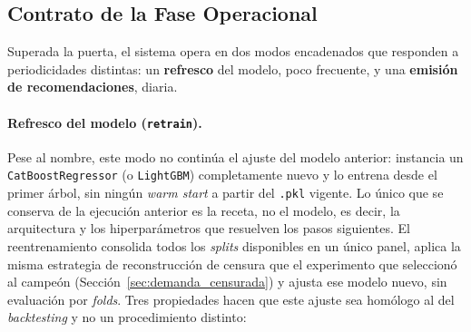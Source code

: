 \subsection{Contrato de la Fase Operacional}
\label{sec:contrato_operacional}

Superada la puerta, el sistema opera en dos modos encadenados que responden a periodicidades distintas: un \textbf{refresco} del modelo, poco frecuente, y una \textbf{emisión de recomendaciones}, diaria.

\paragraph{Refresco del modelo (\texttt{retrain}).} Pese al nombre, este modo no continúa el ajuste del modelo anterior: instancia un \texttt{CatBoostRegressor} (o \texttt{LightGBM}) completamente nuevo y lo entrena desde el primer árbol, sin ningún \textit{warm start} a partir del \texttt{.pkl} vigente. Lo único que se conserva de la ejecución anterior es la receta, no el modelo, es decir, la arquitectura y los hiperparámetros que resuelven los pasos siguientes. El reentrenamiento consolida todos los \textit{splits} disponibles en un único panel, aplica la misma estrategia de reconstrucción de censura que el experimento que seleccionó al campeón (Sección~\ref{sec:demanda_censurada}) y ajusta ese modelo nuevo, sin evaluación por \textit{folds}. Tres propiedades hacen que este ajuste sea homólogo al del \textit{backtesting} y no un procedimiento distinto:

